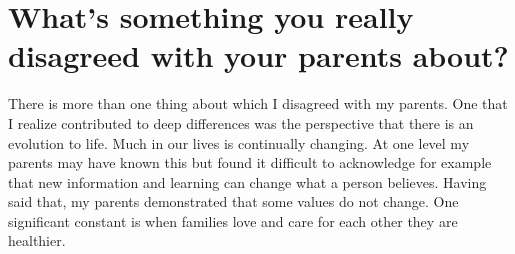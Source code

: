 \section{What's something you really disagreed with your parents about?}

There is more than one thing about which I disagreed with my parents.
One that I realize contributed to deep differences was the perspective that there is an evolution to life.
Much in our lives is continually changing.
At one level my parents may have known this but found it difficult to acknowledge for example that new information and learning can change what a person believes.
Having said that, my parents demonstrated that some values do not change.
One significant constant is when families love and care for each other they are healthier.





